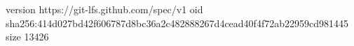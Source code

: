 version https://git-lfs.github.com/spec/v1
oid sha256:414d027bd42f606787d8bc36a2c482888267d4cead40f4f72ab22959cd981445
size 13426

